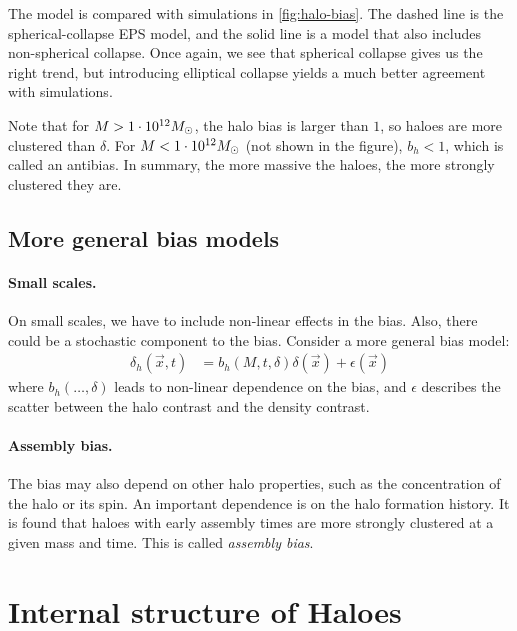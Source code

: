 The model is compared with simulations in \cref{fig:halo-bias}.
The dashed line is the spherical-collapse EPS model, and the solid line is a model that also includes non-spherical collapse.
Once again, we see that spherical collapse gives us the right trend, but introducing elliptical collapse yields a much better agreement with simulations.

Note that for $M > \num{1e12} M_\odot$, the halo bias is larger than $1$, so haloes are more clustered than $\delta$.
For $M < \num{1e12} M_\odot$ (not shown in the figure), $b_h < 1$, which is called an antibias.
In summary, the more massive the haloes, the more strongly clustered they are.

\subsection{More general bias models}

\paragraph*{Small scales.}
On small scales, we have to include non-linear effects in the bias.
Also, there could be a stochastic component to the bias.
Consider a more general bias model:
\begin{align*}
	\delta_h(\vec{x}, t)
	&= 
	b_h(M, t, \delta) \delta(\vec{x})
	+ \epsilon(\vec{x}) 
\end{align*}
where $b_h(\dots, \delta)$ leads to non-linear dependence on the bias, and $\epsilon$ describes the scatter between the halo contrast and the density contrast.

\paragraph*{Assembly bias.}
The bias may also depend on other halo properties, such as the concentration of the halo or its spin.
An important dependence is on the halo formation history.
It is found that haloes with early assembly times are more strongly clustered at a given mass and time. This is called \emph{assembly bias}.





\section{Internal structure of Haloes}

